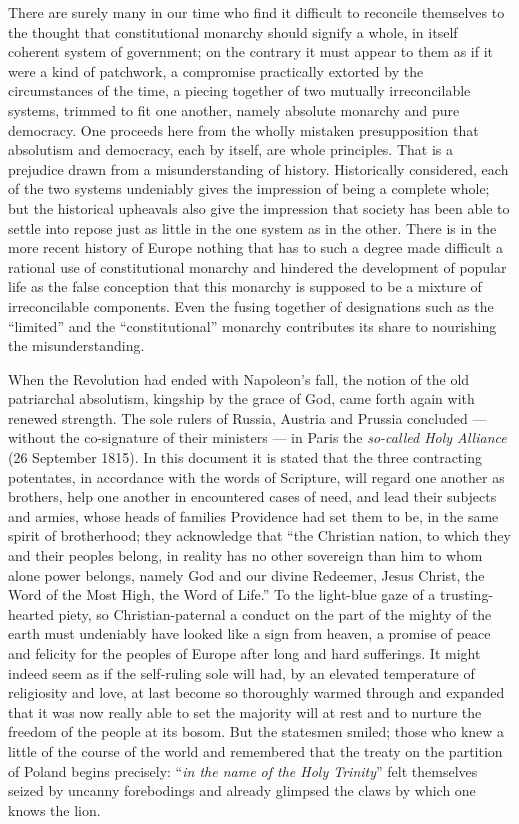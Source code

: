 \documentclass[12pt,a4paper,openany]{book}
\newcommand{\opage}[1]{\marginnote{\footnotesize\textit{[#1]}}}
\begin{document}
There are surely many in our time who find it difficult
to reconcile themselves to the thought that constitutional
monarchy should signify a whole, in itself
coherent system of government; on the contrary it must
appear to them as if it were a kind of patchwork, a compromise
practically extorted by the circumstances of the time, a piecing together
of two mutually irreconcilable systems, trimmed
to fit one another, namely absolute
monarchy and pure democracy. One proceeds here
from the wholly mistaken presupposition that absolutism
and democracy, each by itself, are whole principles. That is
a prejudice drawn from a misunderstanding of history. Historically
considered, each of the two systems undeniably gives
the impression of being a complete whole; but the historical
upheavals also give the impression that society
has been able to settle into repose just as little in the
one system as in the other. There is in the more recent history of Europe
nothing that has to such a degree made difficult a
rational use of constitutional monarchy and
hindered the development of popular life as the false
\setcounter{footnote}{0}%
\opage{25}conception that this monarchy is supposed to be a mixture
of irreconcilable components. Even the fusing together
of designations such as the ``limited'' and the
``constitutional'' monarchy contributes its share to nourishing
the misunderstanding.

When the Revolution had ended with Napoleon's fall,
the notion of the old patriarchal
absolutism, kingship by the grace of God, came forth again with
renewed strength. The sole rulers of Russia, Austria and Prussia
concluded --- without the co-signature of their ministers ---
in Paris the \emph{so-called Holy Alliance}
(26 September 1815). In this document it is stated that
the three contracting potentates, in accordance
with the words of Scripture, will regard one another as brothers,
help one another in encountered cases of need, and lead their
subjects and armies, whose heads of families Providence
had set them to be, in the same spirit of brotherhood;
they acknowledge that ``the Christian nation, to which they
and their peoples belong, in reality has no other
sovereign than him to whom alone power belongs,
namely God and our divine Redeemer, Jesus
Christ, the Word of the Most High, the Word of Life.'' To the
light-blue gaze of a trusting-hearted piety, so
Christian-paternal a conduct on the part of the mighty of the earth must undeniably
have looked like a sign from heaven, a promise
of peace and felicity for the peoples of Europe
after long and hard sufferings. It might indeed seem
as if the self-ruling sole will had, by an elevated
temperature of religiosity and love, at last become
so thoroughly warmed through and expanded that it was now really able
to set the majority will at rest and to nurture the freedom of the people
at its bosom. But the statesmen smiled; those
\setcounter{footnote}{0}%
\opage{26}who knew a little of the course of the world and remembered that
the treaty on the partition of Poland begins precisely: ``\emph{in the name of the
Holy Trinity}'' felt themselves seized by
uncanny forebodings and already glimpsed the claws by
which one knows the lion.
\end{document}
